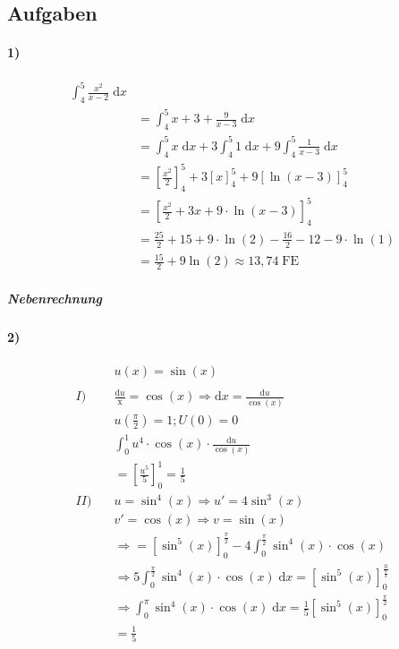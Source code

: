 \subsection{Aufgaben}

\paragraph{1)}

\begin{align*}
    \int_4^5 \frac{x^2}{x-2} \;\mathrm{d}x \\
    &= \int_4^5 x+3 + \frac{9}{x-3} \;\mathrm{d}x \\
    &= \int_4^5 x \;\mathrm{d}x + 3 \int_4^5 1 \;\mathrm{d}x + 9 \int_4^5 \frac{1}{x-3} \;\mathrm{d}x \\
    &= {\left[ \frac{x^2}{2} \right]}_4^5 + 3 {[x]}_4^5 + 9 {[\ln (x-3)]}_4^5 \\
    &= {\left[ \frac{x^2}{2} + 3x + 9 \cdot \ln(x-3) \right]}_4^5 \\
    &= \frac{25}{2} + 15 + 9 \cdot \ln(2) - \frac{16}{2} - 12 -9 \cdot \ln(1) \\
    &= \frac{15}{2} + 9 \ln(2) \approx 13,74\;\mathrm{FE}
\end{align*}


\subparagraph{Nebenrechnung}


\paragraph{2)}

\begin{align*}
    &u(x) = \sin(x) \\
    \\
    I)\quad &\frac{\mathrm{d}u}{\mathrm{x}} = \cos(x) \Rightarrow \mathrm{d}x = \frac{\mathrm{d}u}{\cos(x)} \\
    &u(\frac{\pi}{2}) = 1; U(0) = 0 \\
    &\int_0^1 u^4 \cdot \cos(x) \cdot \frac{\mathrm{d}u}{\cos(x)} \\
    &= {\left[ \frac{u^5}{5} \right]}_0^1 = \frac{1}{5} \\
    II)\quad &u = \sin^4(x) \Rightarrow u' = 4 \sin^3 (x) \\
    &v' = \cos(x) \Rightarrow v = \sin(x) \\
    &\Rightarrow = {\left[ \sin^5(x) \right]}_0^{\frac{\pi}{2}} - 4 \int_0^{\frac{\pi}{2}} \sin^4 (x) \cdot \cos(x) \\
    &\Rightarrow 5 \int_0^\frac{\pi}{2} \sin^4(x) \cdot \cos(x) \;\mathrm{d}x = {\left[ \sin^5(x) \right]}_0^\frac{0}{\frac{\pi}{2}} \\
    &\Rightarrow \int_0^\pi \sin^4(x) \cdot \cos(x) \;\mathrm{d}x = \frac{1}{5} {\left[ \sin^5(x) \right]}_0^\frac{\pi}{2} \\
    &= \frac{1}{5}
\end{align*}

